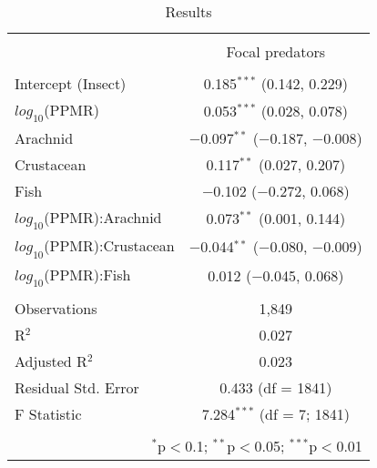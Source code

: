 
\begin{table}[!htbp] \centering 
  \caption{Results} 
  \label{} 
\begin{tabular}{@{\extracolsep{5pt}}lc} 
\\[-1.8ex]\hline 
\hline \\[-1.8ex] 
 & \multicolumn{1}{c}{Focal predators} \\ 
\cline{2-2} 
\hline \\[-1.8ex] 
 Intercept (Insect) & 0.185$^{***}$ (0.142, 0.229) \\ 
  $log_{10}$(PPMR) & 0.053$^{***}$ (0.028, 0.078) \\ 
  Arachnid & $-$0.097$^{**}$ ($-$0.187, $-$0.008) \\ 
  Crustacean & 0.117$^{**}$ (0.027, 0.207) \\ 
  Fish & $-$0.102 ($-$0.272, 0.068) \\ 
  $log_{10}$(PPMR):Arachnid & 0.073$^{**}$ (0.001, 0.144) \\ 
  $log_{10}$(PPMR):Crustacean & $-$0.044$^{**}$ ($-$0.080, $-$0.009) \\ 
  $log_{10}$(PPMR):Fish & 0.012 ($-$0.045, 0.068) \\ 
 \hline \\[-1.8ex] 
Observations & 1,849 \\ 
R$^{2}$ & 0.027 \\ 
Adjusted R$^{2}$ & 0.023 \\ 
Residual Std. Error & 0.433 (df = 1841) \\ 
F Statistic & 7.284$^{***}$ (df = 7; 1841) \\ 
\hline 
\hline \\[-1.8ex] 
\multicolumn{2}{r}{$^{*}$p$<$0.1; $^{**}$p$<$0.05; $^{***}$p$<$0.01} \\ 
\end{tabular} 
\end{table} 
